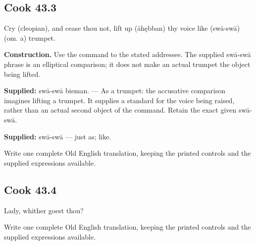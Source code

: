 \par\begin{minipage}{\linewidth}\raggedright
\subsection*{Cook 43.3}

Cry (cleopian), and cease thou not, lift up (āhębban) thy voice like (swā-swā) (om. a) trumpet.

\end{minipage}\par\addvspace{4pt}

\textbf{Construction.} Use the command to the stated addressee. The supplied swā-swā phrase is an elliptical comparison; it does not make an actual trumpet the object being lifted.

\textbf{Supplied:} swā-swā bieman. — As a trumpet: the accusative comparison imagines lifting a trumpet. It supplies a standard for the voice being raised, rather than an actual second object of the command. Retain the exact given swā-swā.

\textbf{Supplied:} swā-swā — just as; like.

Write one complete Old English translation, keeping the printed controls and the supplied expressions available.

\par\begin{minipage}{\linewidth}\raggedright
\subsection*{Cook 43.4}

Lady, whither goest thou?

Write one complete Old English translation, keeping the printed controls and the supplied expressions available.

\end{minipage}\par\addvspace{4pt}

